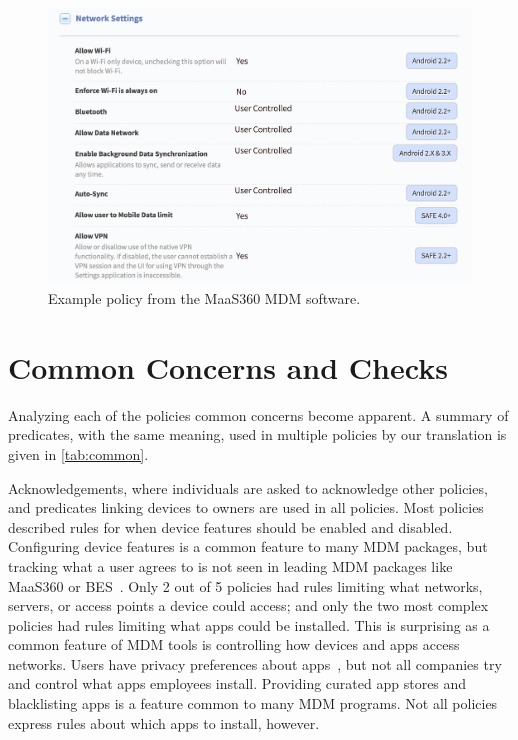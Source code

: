 \documentclass[conference,twocolumn]{IEEEtran}
\begin{document}
\begin{figure}
  \includegraphics[width=\linewidth]{maas360-policy.png}
  \caption{Example policy from the MaaS360 MDM software.}
  \label{fig:policy}
\end{figure}

\section{Common Concerns and Checks}
\label{sec:common_concerns}

Analyzing each of the policies common concerns become apparent.
A summary of predicates, with the same meaning, used in multiple policies by our translation is given in \autoref{tab:common}.


Acknowledgements, where individuals are asked to acknowledge other policies, and predicates linking devices to owners are used in all policies.
Most policies described rules for when device features should be enabled and disabled.
Configuring device features is a common feature to many MDM packages, but tracking what a user agrees to is not seen in leading MDM packages like MaaS360 or BES~\cite{rob_smith_magic_2016}.
Only 2 out of 5 policies had rules limiting what networks, servers, or access points a device could access;
  and only the two most complex policies had rules limiting what apps could be installed.
This is surprising as a common feature of MDM tools is controlling how devices and apps access networks.
Users have privacy preferences about apps~\cite{lin_modeling_2014}, but not all companies try and control what apps employees install.
Providing curated app stores and blacklisting apps is a feature common to many MDM programs.
Not all policies express rules about which apps to install, however.
\end{document}
